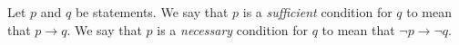 \guard



\begin{defn}
\label{defn:sufficentAndNecessary}
  Let $p$ and $q$ be statements.
  We say that $p$ is a \emph{sufficient} condition for $q$ to mean that $p\rightarrow q$.
  We say that $p$ is a \emph{necessary} condition for $q$ to mean that $\neg p\rightarrow \neg q$.
\end{defn}
